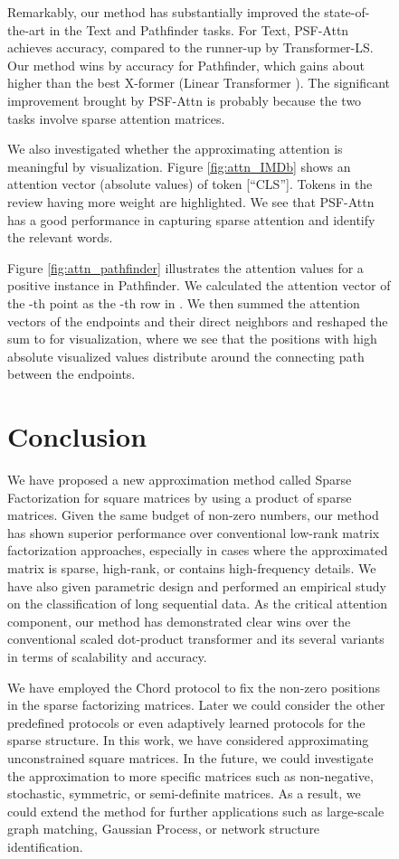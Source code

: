 \documentclass{article}
\begin{document}
\begin{figure}[t]
\begin{center}
Remarkably, our method has substantially improved the state-of-the-art in the Text and Pathfinder tasks. For Text, PSF-Attn achieves  accuracy, compared to the runner-up  by Transformer-LS. Our method wins by  accuracy for Pathfinder, which gains about  higher than the best X-former (Linear Transformer ). The significant improvement brought by PSF-Attn is probably because the two tasks involve sparse attention matrices.

We also investigated whether the approximating attention  is meaningful by visualization.
Figure \ref{fig:attn_IMDb} shows an attention vector (absolute values) of token [``CLS'']. Tokens in the review having more weight are highlighted. We see that PSF-Attn has a good performance in capturing sparse attention and identify the relevant words.

Figure \ref{fig:attn_pathfinder} illustrates the attention values for a positive instance in Pathfinder. We calculated the attention vector of the -th point as the -th row in . We then summed the attention vectors of the endpoints and their direct neighbors and reshaped the sum to  for visualization, where we see that the positions with high absolute visualized values distribute around the connecting path between the endpoints.


\section{Conclusion}
\label{sec:conclusion}
We have proposed a new approximation method called Sparse Factorization for square matrices by using a product of sparse matrices. Given the same budget of non-zero numbers, our method has shown superior performance over conventional low-rank matrix factorization approaches, especially in cases where the approximated matrix is sparse, high-rank, or contains high-frequency details. We have also given parametric design and performed an empirical study on the classification of long sequential data. As the critical attention component, our method has demonstrated clear wins over the conventional scaled dot-product transformer and its several variants in terms of scalability and accuracy.

We have employed the Chord protocol to fix the non-zero positions in the sparse factorizing matrices. Later we could consider the other predefined protocols or even adaptively learned protocols for the sparse structure. In this work, we have considered approximating unconstrained square matrices. In the future, we could investigate the approximation to more specific matrices such as non-negative, stochastic, symmetric, or semi-definite matrices. As a result, we could extend the method for further applications such as large-scale graph matching, Gaussian Process, or network structure identification.





\end{center}
\end{figure}
\end{document}
